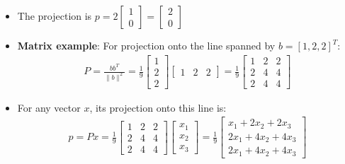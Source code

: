 \begin{frame}{}
\begin{itemize}
    \item The projection is $p = 2\begin{bmatrix}
        1\\0
    \end{bmatrix} = \begin{bmatrix}
        2\\0
    \end{bmatrix}$
    \item \textbf{Matrix example}: For projection onto the line spanned by $b=[1, 2, 2]^T$:
    \begin{align}
        P = \frac{bb^T}{\|b\|^2} = \frac{1}{9} \begin{bmatrix}
            1\\ 2\\ 2 
        \end{bmatrix}\begin{bmatrix}
            1 & 2& 2 
        \end{bmatrix} = \frac{1}{9} \begin{bmatrix}
            1 & 2&2\\
            2&4 & 4\\
            2&4&4
        \end{bmatrix}
    \end{align}
    \item For any vector $x$, its projection onto this line is:
    \begin{align}
        p = Px = \frac{1}{9} \begin{bmatrix}
            1 & 2&2\\
            2&4 & 4\\
            2&4&4
        \end{bmatrix}\begin{bmatrix}
            x_1\\x_2 \\
            x_3
        \end{bmatrix} = \frac{1}{9} \begin{bmatrix}
            x_1 + 2x_2 + 2x_3\\
            2x_1 + 4x_2 + 4x_3\\
            2x_1 + 4x_2 + 4x_3
        \end{bmatrix}
    \end{align}
\end{itemize}
\end{frame}

